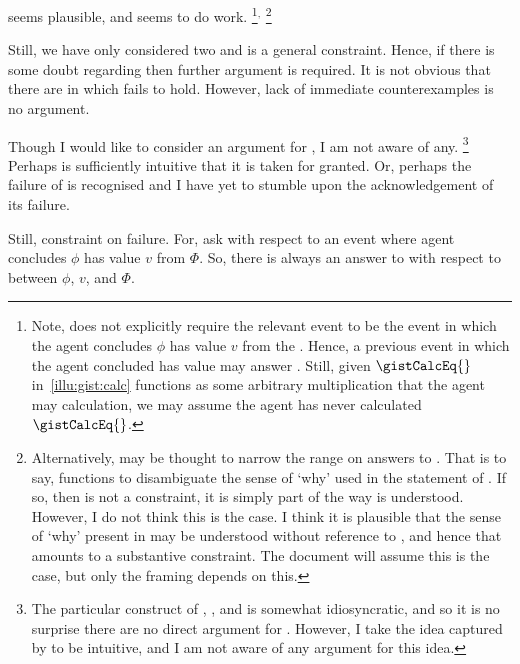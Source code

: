 \begin{note}
  \issueInclusion{} seems plausible, and seems to do work.%
  \footnote{
    Note, \qHow{} does not explicitly require the relevant event to be the event in which the agent concludes \(\phi\) has value \(v\) from the \pool{}.
    Hence, a previous event in which the agent concluded \propM{\gistCalcEq{}} has value  may answer \qHow{}.
    Still, given \(\gistCalcEq{}\) in~\autoref{illu:gist:calc} functions as some arbitrary multiplication that the agent may calculation, we may assume the agent has never calculated \(\gistCalcEq{}\).
  }\(^{,}\)%
  \footnote{
    Alternatively, \issueInclusion{} may be thought to narrow the range on answers to \qWhy{}.
    That is to say, \issueInclusion{} functions to disambiguate the sense of `why' used in the statement of \qWhy{}.
    If so, then \issueInclusion{} is not a constraint, it is simply part of the way \qWhy{} is understood.
    However, I do not think this is the case.
    I think it is plausible that the sense of `why' present in \qWhy{} may be understood without reference to \issueInclusion{}, and hence that \issueInclusion{} amounts to a substantive constraint.
    The document will assume this is the case, but only the framing depends on this.
  }

  Still, we have only considered two  and \issueInclusion{} is a general constraint.
  Hence, if there is some doubt regarding \issueInclusion{} then further argument is required.
  It is not obvious that there are  in which \issueInclusion{} fails to hold.
  However, lack of immediate counterexamples is no argument.

  Though I would like to consider an argument for \issueInclusion{}, I am not aware of any.%
  \footnote{
    The particular construct of \qWhy{}, \qHow{}, and \issueInclusion{} is somewhat idiosyncratic, and so it is no surprise there are no direct argument for \issueInclusion{}.
    However, I take the idea captured by \issueInclusion{} to be intuitive, and I am not aware of any argument for this idea.
  }
  Perhaps \issueInclusion{} is sufficiently intuitive that it is taken for granted.
  Or, perhaps the failure of \issueInclusion{} is recognised and I have yet to stumble upon the acknowledgement of its failure.

  {
    \color{red}
    Still, constraint on failure.
    For, ask \qWhy{} with respect to an event where agent concludes \(\phi\) has value \(v\) from \(\Phi\).
    So, there is always an answer to \qHow{} with respect to \ros{} between \(\phi\), \(v\), and \(\Phi\).

}
\end{note}
